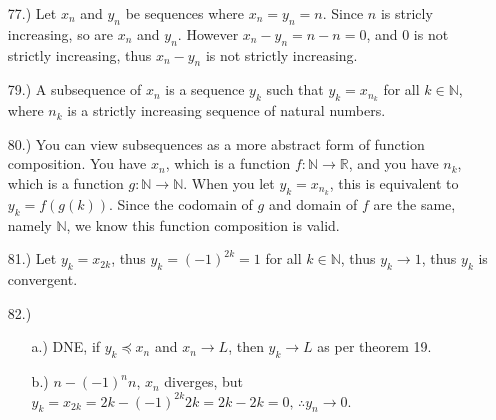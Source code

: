 \documentclass[12pt]{article}
\begin{document}
\begin{itemize}









    \item [77.)] Let $x_n$ and $y_n$ be sequences where $x_n=y_n=n$. Since $n$ is stricly increasing, so are $x_n$ and $y_n$. However $x_n-y_n=n-n=0$, and $0$ is not strictly increasing, thus $x_n-y_n$ is not strictly increasing.

    \item [79.)] A subsequence of $x_n$ is a sequence $y_k$ such that $y_k=x_{n_k}$ for all $k\in\mathbb{N}$, where $n_k$ is a strictly increasing sequence of natural numbers.

    \item [80.)] You can view subsequences as a more abstract form of function composition. You have $x_n$, which is a function $f:\mathbb{N}\to\mathbb{R}$, and you have $n_k$, which is a function $g:\mathbb{N}\to\mathbb{N}$. When you let $y_k=x_{n_k}$, this is equivalent to $y_k=f(g(k))$. Since the codomain of $g$ and domain of $f$ are the same, namely $\mathbb{N}$, we know this function composition is valid.

    \item [81.)] Let $y_k=x_{2k}$, thus $y_k=(-1)^{2k}=1$ for all $k\in\mathbb{N}$, thus $y_k\to1$, thus $y_k$ is convergent.

    \item [82.)] \begin{itemize}
        \item [a.)] DNE, if $y_k\preceq x_n$ and $x_n\to L$, then $y_k\to L$ as per theorem 19.

        \item [b.)] $n-(-1)^nn$, $x_n$ diverges, but $y_k=x_{2k}=2k-(-1)^{2k}2k=2k-2k=0,\,\therefore y_n\to0$.


\end{itemize}
\end{itemize}
\end{document}
